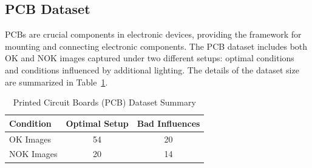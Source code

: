 \documentclass[12pt,DIV14,BCOR12mm,a4paper,footinclude=false,headinclude,parskip=half-,twoside,openright,cleardoublepage=empty,toc=index,bibliography=totoc,listof=totoc]{scrreprt}
\numberwithin{equation}{chapter}
\begin{document}
\subsection{PCB Dataset}
PCBs are crucial components in electronic devices, providing the framework for mounting and connecting electronic components. The PCB dataset includes both OK and NOK images captured under two different setups: optimal conditions and conditions influenced by additional lighting. The details of the dataset size are summarized in Table~\ref{tab:pcb-dataset}.
\begin{table}
    \centering
    \caption{Printed Circuit Boards (PCB) Dataset Summary}
    \label{tab:pcb-dataset}
    \begin{tabular}{lcc}
        \toprule
        \textbf{Condition} & \textbf{Optimal Setup} & \textbf{Bad Influences} \\ 
        \midrule
        OK Images          & 54                     & 20                      \\ 
        NOK Images         & 20                     & 14                      \\ 
        \bottomrule
    \end{tabular}
\end{table}
\end{document}
